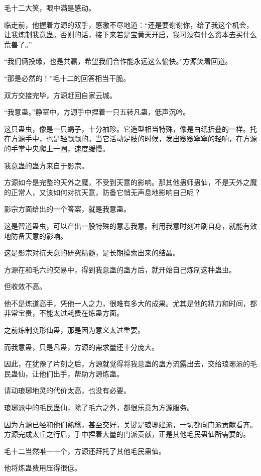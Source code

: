 \begin{this_body}
毛十二大笑，眼中满是感动。

临走前，他握着方源的双手，感激不尽地道：“还是要谢谢你，给了我这个机会，让我炼制我意蛊。否则的话，接下来若是宝黄天开启，我可没有什么资本去买什么荒兽了。”

“我们俩投缘，也是共赢，希望我们合作能永远这么愉快。”方源笑着回道。

“那是必然的！”毛十二的回答相当干脆。

双方交接完毕，方源赶回自家云城。

“我意蛊。”静室中，方源手中捏着一只五转凡蛊，低声沉吟。

这只蛊虫，像是一只蝎子，十分袖珍。它造型相当特殊，像是白纸折叠的一样。托在方源手中，也是轻飘飘的。当它活动足肢的时候，发出窸窸窣窣的轻响，在方源的手掌中央爬上一圈，速度缓慢。

我意蛊的蛊方来自于影宗。

方源如今是完整的天外之魔，不受到天意的影响。那其他蛊师蛊仙，不是天外之魔的正常人，又该如何对抗天意，防备它悄无声息地影响自己呢？

影宗方面给出的一个答案，就是我意蛊。

这是智道蛊虫，可以产出一股特殊的意志我意。利用我意时刻冲刷自身，就能有效地防备天意的影响。

这是影宗对抗天意的研究精髓，是长期摸索出来的结晶。

方源在和毛六的交易中，得到我意蛊的蛊方后，就开始自己炼制这种蛊虫。

但收效不高。

他不是炼道高手，凭他一人之力，很难有多大的成果。尤其是他的精力和时间，都非常宝贵，不能太过耗费在炼蛊方面。

之前炼制变形仙蛊，那是因为意义太过重要。

而我意蛊，只是凡蛊，方源的需求量还十分庞大。

因此，在犹豫了片刻之后，方源就觉得将我意蛊的蛊方流露出去，交给琅琊派的毛民蛊仙，让他们出手，帮助方源炼蛊。

请动琅琊地灵的代价太高，也没有必要。

琅琊派中的毛民蛊仙，除了毛六之外，都很乐意为方源服务。

因为方源已经和他们熟稔，甚至交好，关键是琅琊建派，一切都向门派贡献看齐。方源完成太丘之行后，手中捏着大量的门派贡献，正是其他毛民蛊仙所需要的。

毛十二当然唯一一个，方源还拜托了其他毛民蛊仙。

他将炼蛊费用压得很低。


\end{this_body}
